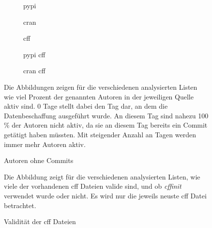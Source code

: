 \begin{figure}
    \begin{subfigure}{.5\textwidth}
        \centering
        
        \caption{\gls{pypi}}
        \label{fig:total_authors_no_commits_pypi}
    \end{subfigure}%
    \begin{subfigure}{.5\textwidth}
        \centering
        
        \caption{\gls{cran}}
        \label{fig:total_authors_no_commits_cran}
    \end{subfigure}
    \begin{subfigure}{.5\textwidth}
        \centering
        
        \caption{\gls{cff}}
        \label{fig:total_authors_no_commits_cff}
    \end{subfigure}%
    \begin{subfigure}{.5\textwidth}
        \centering
        
        \caption{\gls{pypi} \gls{cff}}
        \label{fig:total_authors_no_commits_pypi_cff}
    \end{subfigure}
    \centering
    \begin{subfigure}{.5\textwidth}
        \centering
        
        \caption{\gls{cran} \gls{cff}}
        \label{fig:total_authors_no_commits_cran_cff}
    \end{subfigure}
    \caption{Autoren ohne Commits}
    \small
    \raggedright
    Die Abbildungen zeigen für die verschiedenen analysierten Listen wie viel Prozent der genannten Autoren in der jeweiligen Quelle aktiv sind. 0 Tage stellt dabei den Tag dar, an dem die Datenbeschaffung ausgeführt wurde. An diesem Tag sind nahezu 100 \% der Autoren nicht aktiv, da sie an diesem Tag bereits ein Commit getätigt haben müssten. Mit steigender Anzahl an Tagen werden immer mehr Autoren aktiv.
\end{figure}

\begin{figure}
    
    \label{fig:overall_valid_cff}
    \caption{Validität der \gls{cff} Dateien}
    \small
    \raggedright
    Die Abbildung zeigt für die verschiedenen analysierten Listen, wie viele der vorhandenen \gls{cff} Dateien valide sind, und ob \emph{cffinit} verwendet wurde oder nicht. Es wird nur die jeweils neuste \gls{cff} Datei betrachtet.
\end{figure}

